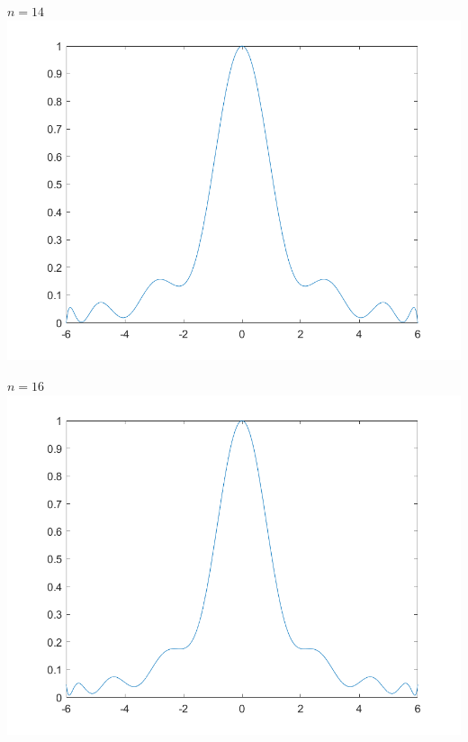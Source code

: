 \begin{center}
	\(n=14\) \\
	\includegraphics[scale=0.55]{cap4/4_7/14.png}
\end{center}

\begin{center}
	\(n=16\) \\
	\includegraphics[scale=0.55]{cap4/4_7/16.png}
\end{center}

